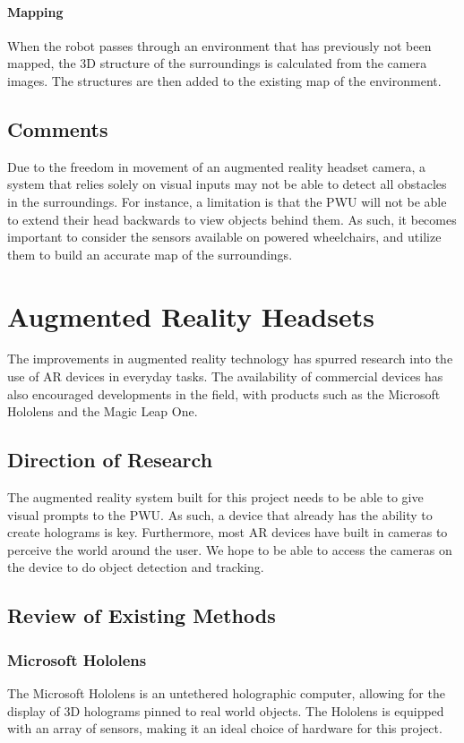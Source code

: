 \paragraph{Mapping}
When the robot passes through an environment that has previously not been mapped, the 3D structure of the surroundings is calculated from the camera images. The structures are then added to the existing map of the environment.

\subsection{Comments}
Due to the freedom in movement of an augmented reality headset camera, a system that relies solely on visual inputs may not be able to detect all obstacles in the surroundings. For instance, a limitation is that the PWU will not be able to extend their head backwards to view objects behind them. As such, it becomes important to consider the sensors available on powered wheelchairs, and utilize them to build an accurate map of the surroundings.

\section{Augmented Reality Headsets}
The improvements in augmented reality technology has spurred research into the use of AR devices in everyday tasks. The availability of commercial devices has also encouraged developments in the field, with products such as the Microsoft Hololens and the Magic Leap One.

\subsection{Direction of Research}
The augmented reality system built for this project needs to be able to give visual prompts to the PWU. As such, a device that already has the ability to create holograms is key. Furthermore, most AR devices have built in cameras to perceive the world around the user. We hope to be able to access the cameras on the device to do object detection and tracking.

\subsection{Review of Existing Methods}

\subsubsection{Microsoft Hololens} \label{back:holo}
The Microsoft Hololens is an untethered holographic computer, allowing for the display of 3D holograms pinned to real world objects. The Hololens is equipped with an array of sensors, making it an ideal choice of hardware for this project.


